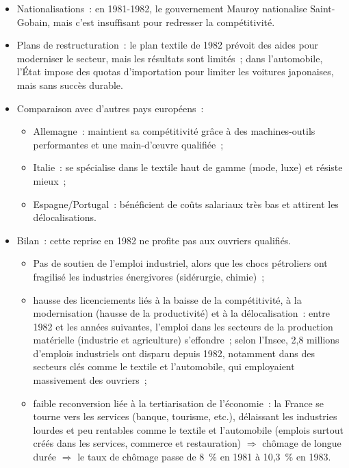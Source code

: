 \begin{itemize}
  \item Nationalisations~: en 1981-1982, le gouvernement Mauroy nationalise
    Saint-Gobain, mais c'est insuffisant pour redresser la compétitivité.
  \item Plans de restructuration~: le plan textile de 1982 prévoit des aides pour
    moderniser le secteur, mais les résultats sont limités~; dans l'automobile, l'État
    impose des quotas d'importation pour limiter les voitures japonaises, mais sans
    succès durable.
  \item Comparaison avec d'autres pays européens~:
    \begin{itemize}
      \item Allemagne~: maintient sa compétitivité grâce à des machines-outils
        performantes et une main-d'œuvre qualifiée~;
      \item Italie~: se spécialise dans le textile haut de gamme (mode, luxe) et résiste
        mieux~;
      \item Espagne/Portugal~: bénéficient de coûts salariaux très bas et attirent les
        délocalisations.
    \end{itemize}
  \item Bilan~: cette reprise en 1982 ne profite pas aux ouvriers qualifiés.
    \begin{itemize}
      \item Pas de soutien de l'emploi industriel, alors que les chocs pétroliers ont
        fragilisé les industries énergivores (sidérurgie, chimie)~;
      \item hausse des licenciements liés à la baisse de la compétitivité, à la
        modernisation (hausse de la productivité) et à la délocalisation~: entre 1982 et
        les années suivantes, l'emploi dans les secteurs de la production matérielle
        (industrie et agriculture) s'effondre~; selon l'Insee, 2,8 millions d'emplois
        industriels ont disparu depuis 1982, notamment dans des secteurs clés comme le
        textile et l'automobile, qui employaient massivement des ouvriers~;
      \item faible reconversion liée à la tertiarisation de l'économie~: la France se
        tourne vers les services (banque, tourisme, etc.), délaissant les industries
        lourdes et peu rentables comme le textile et l'automobile (emplois surtout créés
        dans les services, commerce et restauration) $\Rightarrow$ chômage de longue
        durée $\Rightarrow$ le taux de chômage passe de 8~\% en 1981 à 10,3~\% en 1983.
    \end{itemize}
\end{itemize}

